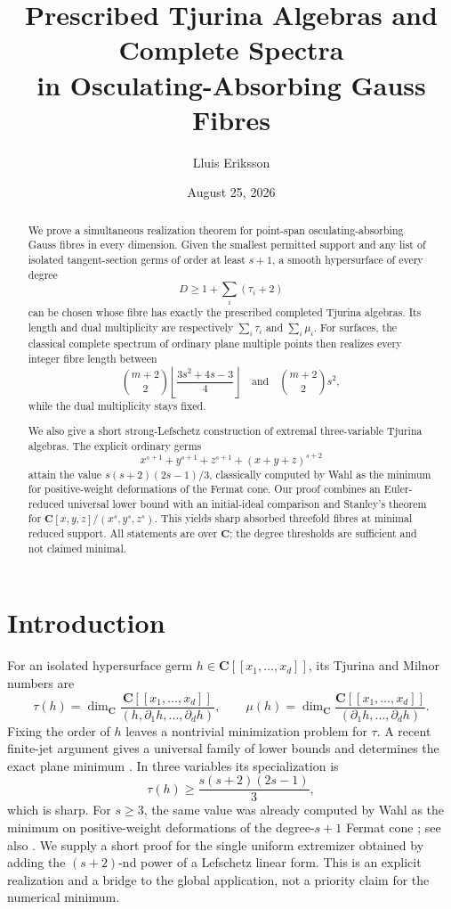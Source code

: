 \documentclass[11pt]{article}
\title{Prescribed Tjurina Algebras and Complete Spectra\\
in Osculating-Absorbing Gauss Fibres}
\author{Lluis Eriksson}
\date{August 25, 2026}
\theoremstyle{remark}
\begin{document}
\maketitle

\begin{abstract}
We prove a simultaneous realization theorem for point-span
osculating-absorbing Gauss fibres in every dimension.  Given the smallest
permitted support and any list of isolated tangent-section germs of order
at least \(s+1\), a smooth hypersurface of every degree
\[
 D\ge1+\sum_i(\tau_i+2)
\]
can be chosen whose fibre has exactly the prescribed completed Tjurina
algebras.  Its length and dual multiplicity are respectively
\(\sum_i\tau_i\) and \(\sum_i\mu_i\).  For surfaces, the classical complete spectrum
of ordinary plane multiple points then realizes every integer fibre length
between
\[
 \binom{m+2}{2}\left\lfloor\frac{3s^2+4s-3}{4}\right\rfloor
 \quad\text{and}\quad
 \binom{m+2}{2}s^2,
\]
while the dual multiplicity stays fixed.

We also give a short strong-Lefschetz construction of extremal
three-variable Tjurina algebras.  The explicit ordinary germs
\[
 x^{s+1}+y^{s+1}+z^{s+1}+(x+y+z)^{s+2}
\]
attain the value \(s(s+2)(2s-1)/3\), classically computed by Wahl as the
minimum for positive-weight deformations of the Fermat cone.  Our proof
combines an Euler-reduced universal lower bound with an initial-ideal
comparison and Stanley's theorem for
\(\mathbf C[x,y,z]/(x^s,y^s,z^s)\).  This yields sharp absorbed
threefold fibres at minimal reduced support.  All statements are over
\(\mathbf C\); the degree thresholds are sufficient and not claimed
minimal.
\end{abstract}

\section{Introduction}

For an isolated hypersurface germ
\(h\in\mathbf C[[x_1,\ldots,x_d]]\), its Tjurina and Milnor numbers are
\[
 \tau(h)=\dim_{\mathbf C}\frac{\mathbf C[[x_1,\ldots,x_d]]}
 {(h,\partial_1h,\ldots,\partial_dh)},
 \qquad
 \mu(h)=\dim_{\mathbf C}\frac{\mathbf C[[x_1,\ldots,x_d]]}
 {(\partial_1h,\ldots,\partial_dh)}.
\]
Fixing the order of \(h\) leaves a nontrivial minimization problem for
\(\tau\).  A recent finite-jet argument gives a universal family of lower
bounds and determines the exact plane minimum
\cite{ErikssonEuler2026}.  In three variables its specialization is
\[
 \tau(h)\ge \frac{s(s+2)(2s-1)}3,
\]
which is sharp.  For \(s\ge3\), the same value was already computed by
Wahl as the minimum on positive-weight deformations of the degree-\(s+1\)
Fermat cone \cite[Example~4.7]{Wahl1985}; see also
\cite[Example~4.6]{Almiron2022}.  We supply a short proof for the single
uniform extremizer obtained by adding the \((s+2)\)-nd power of a
Lefschetz linear form.  This is an explicit realization and a bridge to the
global application, not a priority claim for the numerical minimum.
\end{document}
